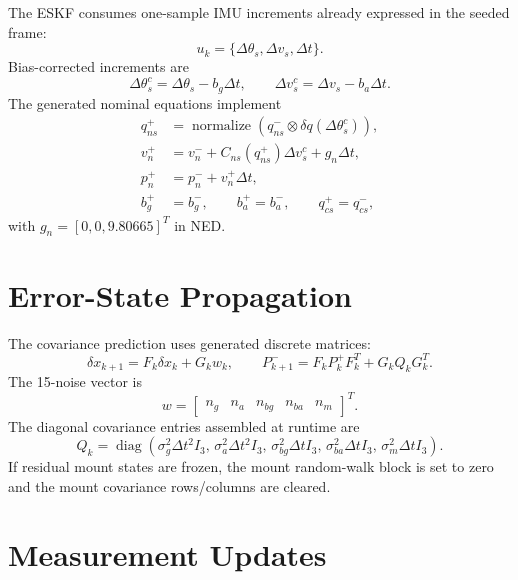 \documentclass[11pt]{article}
\newcommand{\T}{^{T}}
\newcommand{\dq}{\delta q}
\newcommand{\dt}{\Delta t}
\begin{document}
The ESKF consumes one-sample IMU increments already expressed in the seeded
frame:
\begin{equation}
  u_k = \{\Delta\theta_s,\Delta v_s,\dt\}.
\end{equation}
Bias-corrected increments are
\begin{equation}
  \Delta\theta_s^c=\Delta\theta_s-b_g\dt,\qquad
  \Delta v_s^c=\Delta v_s-b_a\dt .
\end{equation}
The generated nominal equations implement
\begin{align}
  q_{ns}^{+} &= \operatorname{normalize}\left(q_{ns}^{-}\otimes
  \dq(\Delta\theta_s^c)\right),\\
  v_n^{+} &= v_n^{-}+C_{ns}(q_{ns}^{+})\Delta v_s^c+g_n\dt,\\
  p_n^{+} &= p_n^{-}+v_n^{+}\dt,\\
  b_g^{+}&=b_g^{-},\qquad b_a^{+}=b_a^{-},\qquad q_{cs}^{+}=q_{cs}^{-},
\end{align}
with \(g_n=[0,0,9.80665]\T\) in NED.

\section{Error-State Propagation}

The covariance prediction uses generated discrete matrices:
\begin{equation}
  \delta x_{k+1}=F_k\delta x_k+G_kw_k,
  \qquad
  P_{k+1}^{-}=F_kP_k^{+}F_k\T+G_kQ_kG_k\T .
\end{equation}
The 15-noise vector is
\begin{equation}
  w=
  \begin{bmatrix}
  n_g & n_a & n_{bg} & n_{ba} & n_m
  \end{bmatrix}\T .
\end{equation}
The diagonal covariance entries assembled at runtime are
\begin{equation}
  Q_k=\operatorname{diag}\left(
  \sigma_g^2\dt^2 I_3,\,
  \sigma_a^2\dt^2 I_3,\,
  \sigma_{bg}^2\dt I_3,\,
  \sigma_{ba}^2\dt I_3,\,
  \sigma_m^2\dt I_3
  \right).
\end{equation}
If residual mount states are frozen, the mount random-walk block is set to zero
and the mount covariance rows/columns are cleared.

\section{Measurement Updates}
\end{document}

